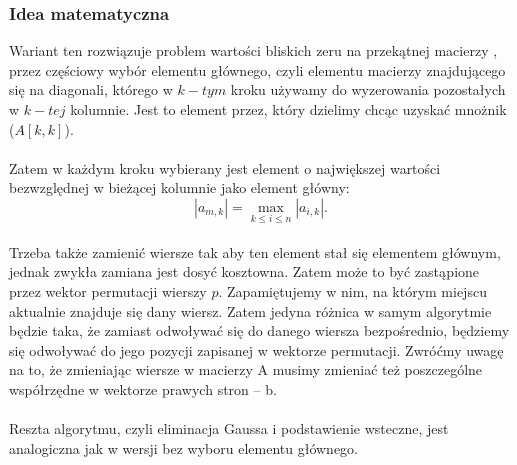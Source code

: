 \documentclass{article}
\begin{document}
\subsubsection{Idea matematyczna}
 Wariant ten rozwiązuje problem wartości bliskich zeru na przekątnej macierzy , przez częściowy wybór elementu głównego, czyli elementu macierzy znajdującego się na diagonali, którego w $k-tym$ kroku używamy do wyzerowania pozostałych w $k-tej$ kolumnie. Jest to element przez, który dzielimy chcąc uzyskać mnożnik ($A[k, k]$).
 \\ \\ Zatem w każdym kroku wybierany jest element o największej wartości bezwzględnej w bieżącej kolumnie jako element główny:
 \[
 |a_{m,k}| = \max_{k \leq i \leq n} |a_{i,k}|.
 \]
 \\ Trzeba także zamienić wiersze tak aby ten element stał się elementem głównym, jednak zwykła zamiana jest dosyć kosztowna. Zatem może to być zastąpione przez wektor permutacji wierszy $p$. Zapamiętujemy w nim, na którym miejscu aktualnie znajduje się dany wiersz. Zatem jedyna różnica w samym algorytmie będzie taka, że zamiast odwoływać się do danego wiersza bezpośrednio, będziemy się odwoływać do jego pozycji zapisanej w wektorze permutacji. Zwróćmy uwagę na to, że zmieniając wiersze w macierzy A musimy zmieniać też poszczególne współrzędne w wektorze prawych stron -- b.
 \\ \\ Reszta algorytmu, czyli eliminacja Gaussa i podstawienie wsteczne, jest analogiczna jak w wersji bez wyboru elementu głównego.
\end{document}
